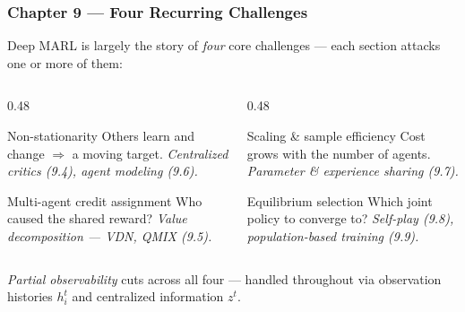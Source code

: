 \begin{frame}
\frametitle{Chapter 9 --- Four Recurring Challenges}

Deep MARL is largely the story of \emph{four} core challenges --- each section
attacks one or more of them:

\vspace{0.4em}
\begin{columns}[T,onlytextwidth]

\begin{column}{0.48\textwidth}
\begin{block}{Non-stationarity}
\small Others learn and change $\Rightarrow$ a moving target.
\emph{Centralized critics (9.4), agent modeling (9.6).}
\end{block}

\begin{block}{Multi-agent credit assignment}
\small Who caused the shared reward?
\emph{Value decomposition --- VDN, QMIX (9.5).}
\end{block}
\end{column}

\begin{column}{0.48\textwidth}
\begin{block}{Scaling \& sample efficiency}
\small Cost grows with the number of agents.
\emph{Parameter \& experience sharing (9.7).}
\end{block}

\begin{block}{Equilibrium selection}
\small Which joint policy to converge to?
\emph{Self-play (9.8), population-based training (9.9).}
\end{block}
\end{column}

\end{columns}

\vspace{0.8em}
\centering
\emph{Partial observability} cuts across all four --- handled throughout via
observation histories $h_i^t$ and centralized information $z^t$.



\end{frame}

